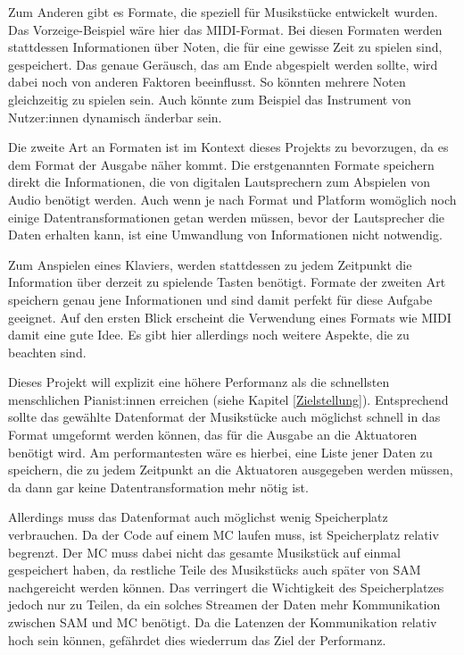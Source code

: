 Zum Anderen gibt es Formate, die speziell für Musikstücke entwickelt wurden.
Das Vorzeige-Beispiel wäre hier das \ac{MIDI}-Format.
Bei diesen Formaten werden stattdessen Informationen über Noten, die für eine gewisse Zeit zu spielen sind, gespeichert.
Das genaue Geräusch, das am Ende abgespielt werden sollte, wird dabei noch von anderen Faktoren beeinflusst.
So könnten mehrere Noten gleichzeitig zu spielen sein.
Auch könnte zum Beispiel das Instrument von Nutzer:innen dynamisch änderbar sein.

Die zweite Art an Formaten ist im Kontext dieses Projekts zu bevorzugen, da es dem Format der Ausgabe näher kommt.
Die erstgenannten Formate speichern direkt die Informationen, die von digitalen Lautsprechern zum Abspielen von Audio benötigt werden.
Auch wenn je nach Format und Platform womöglich noch einige Datentransformationen getan werden müssen, bevor der Lautsprecher die Daten erhalten kann, ist eine Umwandlung von Informationen nicht notwendig.

Zum Anspielen eines Klaviers, werden stattdessen zu jedem Zeitpunkt die Information über derzeit zu spielende Tasten benötigt.
Formate der zweiten Art speichern genau jene Informationen und sind damit perfekt für diese Aufgabe geeignet.
Auf den ersten Blick erscheint die Verwendung eines Formats wie \ac{MIDI} damit eine gute Idee.
Es gibt hier allerdings noch weitere Aspekte, die zu beachten sind.

Dieses Projekt will explizit eine höhere Performanz als die schnellsten menschlichen Pianist:innen erreichen (siehe Kapitel \ref*{Zielstellung}).
Entsprechend sollte das gewählte Datenformat der Musikstücke auch möglichst schnell in das Format umgeformt werden können, das für die Ausgabe an die Aktuatoren benötigt wird.
Am performantesten wäre es hierbei, eine Liste jener Daten zu speichern, die zu jedem Zeitpunkt an die Aktuatoren ausgegeben werden müssen, da dann gar keine Datentransformation mehr nötig ist.

Allerdings muss das Datenformat auch möglichst wenig Speicherplatz verbrauchen.
Da der Code auf einem \ac{MC} laufen muss, ist Speicherplatz relativ begrenzt.
Der \ac{MC} muss dabei nicht das gesamte Musikstück auf einmal gespeichert haben, da restliche Teile des Musikstücks auch später von \ac{SAM} nachgereicht werden können.
Das verringert die Wichtigkeit des Speicherplatzes jedoch nur zu Teilen, da ein solches Streamen der Daten mehr Kommunikation zwischen \ac{SAM} und {MC} benötigt.
Da die Latenzen der Kommunikation relativ hoch sein können, gefährdet dies wiederrum das Ziel der Performanz.

